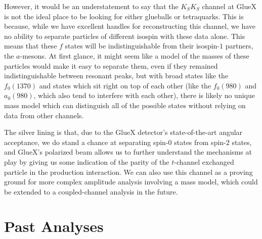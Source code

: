 However, it would be an understatement to say that the $K_SK_S$ channel at GlueX is not the ideal place to be looking for either glueballs or tetraquarks. This is because, while we have excellent handles for reconstructing this channel, we have no ability to separate particles of different isospin with these data alone. This means that these $f$ states will be indistinguishable from their isospin-$1$ partners, the $a$-mesons. At first glance, it might seem like a model of the masses of these particles would make it easy to separate them, even if they remained indistinguishable between resonant peaks, but with broad states like the $f_0(1370)$ and states which sit right on top of each other (like the $f_0(980)$ and $a_0(980)$, which also tend to interfere with each other), there is likely no unique mass model which can distinguish all of the possible states without relying on data from other channels.

The silver lining is that, due to the GlueX detector's state-of-the-art angular acceptance\cite{adhikari_gluex_2021}, we do stand a chance at separating spin-$0$ states from spin-$2$ states, and GlueX's polarized beam allows us to further understand the mechanisms at play by giving us some indication of the parity of the $t$-channel exchanged particle in the production interaction. We can also use this channel as a proving ground for more complex amplitude analysis involving a mass model, which could be extended to a coupled-channel analysis in the future.


\section{Past Analyses}

